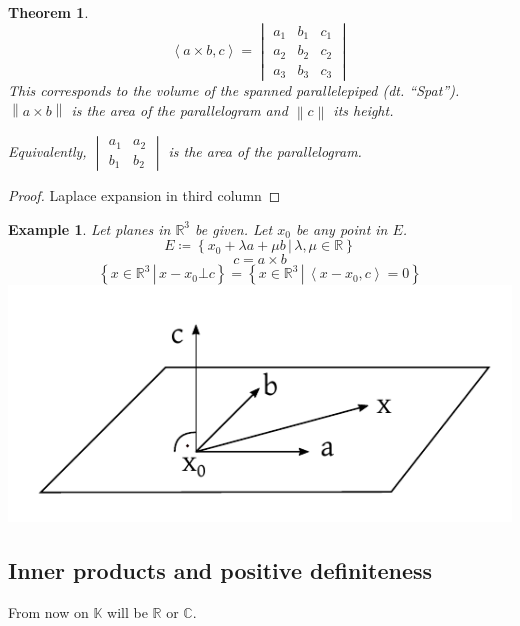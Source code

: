 \documentclass[a4paper]{article}
\newcounter{lecref}[section]
\numberwithin{lecref}{section}
\newtheorem{theorem}[lecref]{Theorem}
\newtheorem{example}[lecref]{Example}
\newcommand{\setdef}[2]{\left\{\left.#1\,\right|\,#2\right\}}
\newcommand{\angel}[1]{\left\langle#1\right\rangle}
\newcommand{\norm}[1]{\left\|#1\right\|}
\begin{document}
\begin{theorem} %
  \[ \angel{a \times b, c} = \begin{vmatrix} a_1 & b_1 & c_1 \\ a_2 & b_2 & c_2 \\ a_3 & b_3 & c_3 \end{vmatrix} \]
  This corresponds to the volume of the spanned parallelepiped (dt. \foreignlanguage{german}{\enquote{Spat}}).
  $\norm{a \times b}$ is the area of the parallelogram and $\norm{c}$ its height.

  Equivalently, $\begin{vmatrix} a_1 & a_2 \\ b_1 & b_2 \end{vmatrix}$ is the area of the parallelogram.
\end{theorem}

\begin{proof}
  Laplace expansion in third column
\end{proof}

\begin{example} %
  Let planes in $\mathbb R^3$ be given. Let $x_0$ be any point in $E$.
  \[ E \coloneqq \setdef{x_0 + \lambda a + \mu b}{\lambda, \mu \in \mathbb R} \]
  \[ c = a \times b \]
  \[ \setdef{x \in \mathbb R^3}{x - x_0 \bot c} = \setdef{x \in \mathbb R^3}{\angel{x - x_0, c} = 0} \]
  \includegraphics{img/05_application.pdf}
\end{example}

\subsection{Inner products and positive definiteness}
From now on $\mathbb K$ will be $\mathbb R$ or $\mathbb C$.
\end{document}
